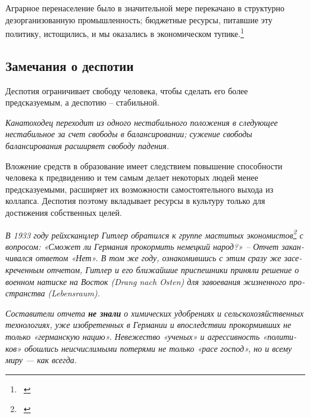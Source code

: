 \documentclass[twoside,a4paper]{article}
\begin{document}
{
Аграрное перенаселение было в значительной мере перекачано в структурно дезорганизованную промышленность; бюджетные
ресурсы, питавшие эту политику, истощились, и мы оказались в экономическом тупике.\footnote{\ } }

\subsection[Замечания о деспотии]{\rmfamily Замечания о деспотии}
{
Деспотия ограничивает свободу человека, чтобы сделать его более предсказуемым, а деспотию – стабильной. }

{\itshape
Канатоходец переходит из одного нестабильного положения в следующее нестабильное за счет свободы в балансировании;
сужение свободы балансирования расширяет свободу падения.}

{
Вложение средств в образование имеет следствием повышение способности человека к предвидению и тем самым делает
некоторых людей менее предсказуемыми, расширяет их возможности самостоятельного выхода из коллапса. Деспотия поэтому
вкладывает ресурсы в культуру только для достижения собственных целей. \ }

{\itshape
\foreignlanguage{russian}{В 1933 году рейхсканцлер Гитлер обратился к группе маститых
экономистов}\footnote{\ }\foreignlanguage{russian}{ с вопросом: «Сможет ли
Германия прокормить немецкий народ?» – Отчет заканчивался ответом «Нет». В том же году, ознакомившись с этим сразу же
засекреченным отчетом, Гитлер и его ближайшие приспешники приняли решение о военном натиске на Восток
(}Drang\foreignlanguage{russian}{ }nach\foreignlanguage{russian}{ }Osten\foreignlanguage{russian}{) для завоевания
жизненного пространства (}Lebensraum\foreignlanguage{russian}{). }}

{\itshape
\foreignlanguage{russian}{Составители отчета }\foreignlanguage{russian}{\textbf{не знали}}\foreignlanguage{russian}{ о
химических удобрениях и сельскохозяйственных технологиях, уже изобретенных в Германии и впоследствии прокормивших не
только «германскую нацию». Невежество «ученых» и агрессивность «политиков» обошлись неисчислимыми потерями не только
«расе господ», но и всему миру — как всегда. }}
\end{document}
